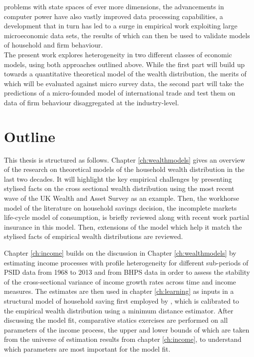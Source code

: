 problems with state spaces of ever more dimensions, the advancements in computer
power have also vastly improved data processing capabilities, a development that
in turn has led to a surge in empirical work exploiting large microeconomic data
sets, the results of which can then be used to validate models of household
and firm behaviour. \\
The present work explores heterogeneity in two different classes of economic models,
using both approaches outlined above. While the first part will build up towards
a quantitative theoretical model of the wealth distribution, the merits of which
will be evaluated against micro survey data, the second part will take the predictions
of a micro-founded model of international trade and test them on data of firm 
behaviour disaggregated at the industry-level. 

\section{Outline}
This thesis is structured as follows. Chapter \ref{ch:wealthmodels} gives an overview of the research 
on theoretical models of the household wealth distribution in the last two decades. 
It will highlight the key empirical challenges by presenting stylised facts on 
the cross sectional wealth distribution using the most recent wave of the UK
Wealth and Asset Survey as an example. Then, the workhorse model of the literature
on household savings decision, the incomplete markets life-cycle model of consumption,
is briefly reviewed along with recent work partial insurance in this model. 
Then, extensions of the model which help it match the stylised facts of empirical
wealth distributions are reviewed.

Chapter \ref{ch:income} builds on the discussion in Chapter \ref{ch:wealthmodels} 
by estimating income processes with profile heterogeneity for different sub-periods 
of PSID data from 1968 to 2013 and from BHPS 
data in order to assess the stability of the cross-sectional variance of income 
growth rates across time and income measures. The estimates are then used
in chapter \ref{ch:learning} as inputs 
in a structural model of household saving first employed by \citet{Guvenen2007}, 
which is calibrated to the empirical wealth distribution using a minimum distance
estimator. After discussing the model fit, comparative statics exercises are 
performed on all parameters of the income process, the upper and lower bounds of
which are taken from the universe of estimation results from chapter \ref{ch:income},
to understand which parameters are most important for the model fit. 

